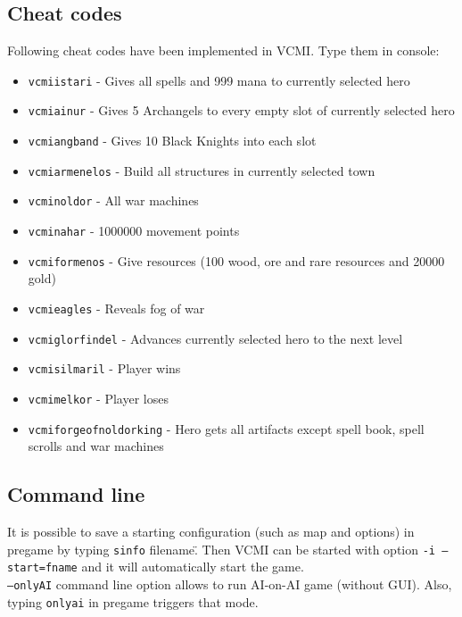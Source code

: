 \documentclass[a4size,final]{article}
\begin{document}
\subsection{Cheat codes}
Following cheat codes have been implemented in VCMI. Type them in console:
\begin{itemize}
\item \texttt{vcmiistari} - Gives all spells and 999 mana to currently selected hero
\item \texttt{vcmiainur} - Gives 5 Archangels to every empty slot of currently selected hero
\item \texttt{vcmiangband} - Gives 10 Black Knights into each slot
\item \texttt{vcmiarmenelos} - Build all structures in currently selected town
\item \texttt{vcminoldor} - All war machines
\item \texttt{vcminahar} - 1000000 movement points
\item \texttt{vcmiformenos} - Give resources (100 wood, ore and rare resources and 20000 gold)
\item \texttt{vcmieagles} - Reveals fog of war
\item \texttt{vcmiglorfindel} - Advances currently selected hero to the next level
\item \texttt{vcmisilmaril} - Player wins
\item \texttt{vcmimelkor} - Player loses
\item \texttt{vcmiforgeofnoldorking} - Hero gets all artifacts except spell book, spell scrolls and war machines
\end{itemize}
\subsection{Command line}
It is possible to save a starting configuration (such as map and options) in pregame by typing \"\texttt{sinfo} filename\". Then VCMI can be started with option \texttt{-i --start=fname} and it will automatically start the game.\\
\texttt{--onlyAI} command line option allows to run AI-on-AI game (without GUI). Also, typing \texttt{onlyai} in pregame triggers that mode.
\newpage
\end{document}
